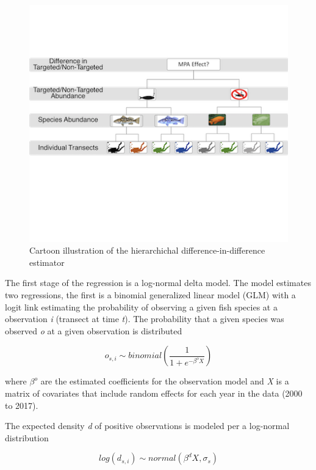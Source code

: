 \documentclass[]{article}
\begin{document}
\newpage

\begin{figure}
\centering
\includegraphics{figs/estimation-cartoon.png}
\caption{\label{fig:cartoon}Cartoon illustration of the hierarchichal difference-in-difference estimator}
\end{figure}

\pagebreak

The first stage of the regression is a log-normal delta model. The model estimates two regressions, the first is a binomial generalized linear model (GLM) with a logit link estimating the probability of observing a given fish species at a observation \emph{i} (transect at time \emph{t}). The probability that a given species was observed \emph{o} at a given observation is distributed

\begin{equation}
o_{s,i} \sim binomial(\frac{1}{1 +e^{-\beta^{o}{X}}})
  \label{eq:binom}
\end{equation}

where \(\beta^{o}\) are the estimated coefficients for the observation model and \emph{X} is a matrix of covariates that include random effects for each year in the data (2000 to 2017).

The expected density \emph{d} of positive observations is modeled per a log-normal distribution

\begin{equation}
  log(d_{s,i}) \sim normal(\beta^{d}X, \sigma_s)
   \label{eq:logd}
 \end{equation}
\end{document}
